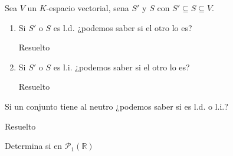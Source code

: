 \begin{exercise}{}{}
    Sea $V$ un $K$-espacio vectorial, sena $S'$ y $S$ con $S' \subseteq S \subseteq V$.
    \begin{enumerate}
        \item Si $S'$ o $S$ es l.d. ¿podemos saber si el otro lo es?
\begin{solution}{}{}
Resuelto
\end{solution}


        \item Si $S'$ o $S$ es l.i. ¿podemos saber si el otro lo es?
\begin{solution}{}{}
Resuelto
\end{solution}
    \end{enumerate}
\end{exercise}


\begin{exercise}{}{}
    Si un conjunto tiene al neutro ¿podemos saber si es l.d. o l.i.?

\begin{solution}{}{}
Resuelto
\end{solution}
\end{exercise}

\begin{exercise}{}{}
    Determina si en $\mathcal{P}_1(\mathbb{R})$ 
\end{exercise}


